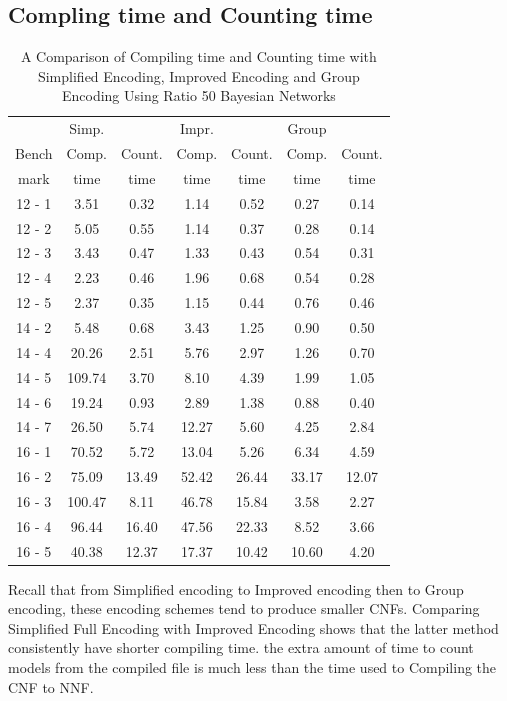 \subsection{Compling time and Counting time}
\begin{table}[]
    \centering
    \begin{tabular}{ c | c c | c c | c c}
    \hline
    	    	&	Simp.	&		&	Impr. 	&	 &	Group	&		\\
   		Bench	&	Comp.	&	Count.	&	Comp. 	&	Count. &	Comp. 	&	Count.	\\
   		mark		&	time	&	time	&	time	&time	& time	&	time	\\
   	\hline
   	\hline
12	-	1	&	3.51	&	0.32	&	1.14	&	0.52	&	0.27	&	0.14	\\
12	-	2	&	5.05	&	0.55	&	1.14	&	0.37	&	0.28	&	0.14	\\
12	-	3	&	3.43	&	0.47	&	1.33	&	0.43	&	0.54	&	0.31	\\
12	-	4	&	2.23	&	0.46	&	1.96	&	0.68	&	0.54	&	0.28	\\
12	-	5	&	2.37	&	0.35	&	1.15	&	0.44	&	0.76	&	0.46	\\
14	-	2	&	5.48	&	0.68	&	3.43	&	1.25	&	0.90	&	0.50	\\
14	-	4	&	20.26	&	2.51	&	5.76	&	2.97	&	1.26	&	0.70	\\
14	-	5	&	109.74	&	3.70	&	8.10	&	4.39	&	1.99	&	1.05	\\
14	-	6	&	19.24	&	0.93	&	2.89	&	1.38	&	0.88	&	0.40	\\
14	-	7	&	26.50	&	5.74	&	12.27	&	5.60	&	4.25	&	2.84	\\
16	-	1	&	70.52	&	5.72	&	13.04	&	5.26	&	6.34	&	4.59	\\
16	-	2	&	75.09	&	13.49	&	52.42	&	26.44	&	33.17	&	12.07	\\
16	-	3	&	100.47	&	8.11	&	46.78	&	15.84	&	3.58	&	2.27	\\
16	-	4	&	96.44	&	16.40	&	47.56	&	22.33	&	8.52	&	3.66	\\
16	-	5	&	40.38	&	12.37	&	17.37	&	10.42	&	10.60	&	4.20	\\
	\hline
	\hline
    \end{tabular}
    \caption{A Comparison of Compiling time and Counting time with Simplified Encoding, Improved Encoding and Group Encoding Using Ratio 50 Bayesian Networks}
    \label{tab:comparing time}
\end{table}

\noindent Recall that from Simplified encoding to Improved encoding then to Group encoding, these encoding schemes tend to produce smaller CNFs. Comparing Simplified Full Encoding with Improved Encoding shows that the latter method consistently have shorter compiling time.  the extra amount of time to count models from the compiled file is much less than the time used to Compiling the CNF to NNF.\\

